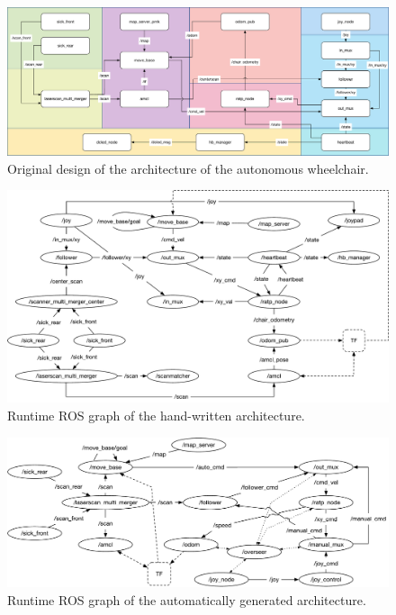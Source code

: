 \begin{landscape}
	\begin{figure}[t]
	\centering
	\includegraphics[width=0.95\textheight]{gfx/pmk/softwarearchitecture}
	\caption{Original design of the architecture of the autonomous wheelchair.}
	\label{fig:pmk-doc}
	\end{figure}
\end{landscape}

\begin{landscape}
	\begin{figure}[t]
	\centering
	\includegraphics[width=0.95\textheight]{gfx/pmk/hand-graph}
	\caption{Runtime ROS graph of the hand-written architecture.}
	\label{fig:pmk-graph}
	\end{figure}
\end{landscape}

\begin{landscape}
	\begin{figure}[t]
	\centering
	\includegraphics[width=0.95\textheight]{gfx/pmk/gen-graph}
	\caption{Runtime ROS graph of the automatically generated architecture.}
	\label{fig:gen-graph}
	\end{figure}
\end{landscape}

